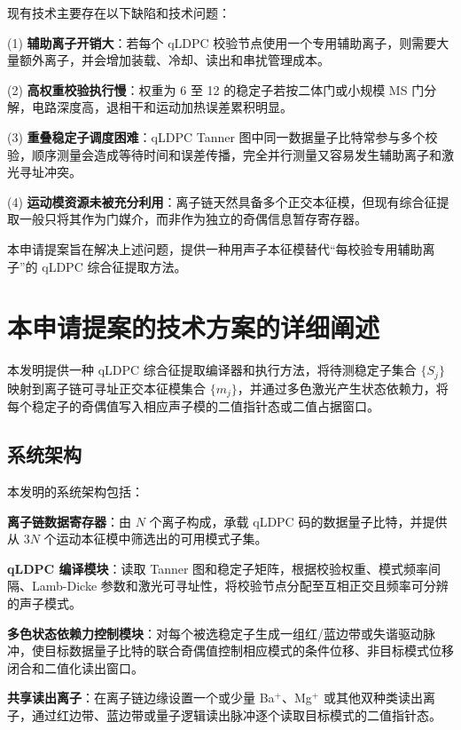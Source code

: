 \documentclass[12pt,a4paper]{article}
\begin{document}
现有技术主要存在以下缺陷和技术问题：

(1) \textbf{辅助离子开销大}：若每个 qLDPC 校验节点使用一个专用辅助离子，则需要大量额外离子，并会增加装载、冷却、读出和串扰管理成本。

(2) \textbf{高权重校验执行慢}：权重为 6 至 12 的稳定子若按二体门或小规模 MS 门分解，电路深度高，退相干和运动加热误差累积明显。

(3) \textbf{重叠稳定子调度困难}：qLDPC Tanner 图中同一数据量子比特常参与多个校验，顺序测量会造成等待时间和误差传播，完全并行测量又容易发生辅助离子和激光寻址冲突。

(4) \textbf{运动模资源未被充分利用}：离子链天然具备多个正交本征模，但现有综合征提取一般只将其作为门媒介，而非作为独立的奇偶信息暂存寄存器。

本申请提案旨在解决上述问题，提供一种用声子本征模替代“每校验专用辅助离子”的 qLDPC 综合征提取方法。

\section{本申请提案的技术方案的详细阐述}

本发明提供一种 qLDPC 综合征提取编译器和执行方法，将待测稳定子集合 $\{S_j\}$ 映射到离子链可寻址正交本征模集合 $\{m_j\}$，并通过多色激光产生状态依赖力，将每个稳定子的奇偶值写入相应声子模的二值指针态或二值占据窗口。

\subsection{系统架构}

本发明的系统架构包括：

\textbf{离子链数据寄存器}：由 $N$ 个离子构成，承载 qLDPC 码的数据量子比特，并提供从 $3N$ 个运动本征模中筛选出的可用模式子集。

\textbf{qLDPC 编译模块}：读取 Tanner 图和稳定子矩阵，根据校验权重、模式频率间隔、Lamb-Dicke 参数和激光可寻址性，将校验节点分配至互相正交且频率可分辨的声子模式。

\textbf{多色状态依赖力控制模块}：对每个被选稳定子生成一组红/蓝边带或失谐驱动脉冲，使目标数据量子比特的联合奇偶值控制相应模式的条件位移、非目标模式位移闭合和二值化读出窗口。

\textbf{共享读出离子}：在离子链边缘设置一个或少量 Ba$^+$、Mg$^+$ 或其他双种类读出离子，通过红边带、蓝边带或量子逻辑读出脉冲逐个读取目标模式的二值指针态。
\end{document}
